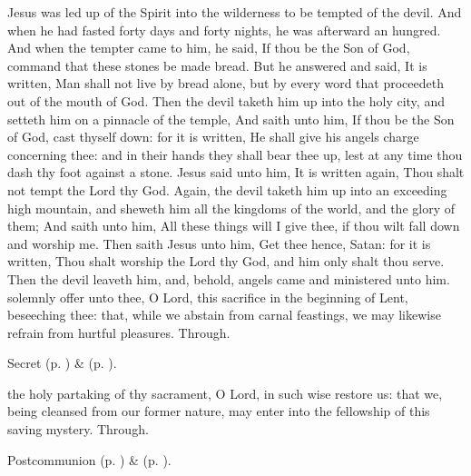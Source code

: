  Jesus was led up of the Spirit into the wilderness to be tempted of the devil. And when he had fasted forty days and forty nights, he was afterward an hungred. And when the tempter came to him, he said, If thou be the Son of God, command that these stones be made bread. But he answered and said, It is written, Man shall not live by bread alone, but by every word that proceedeth out of the mouth of God. Then the devil taketh him up into the holy city, and setteth him on a pinnacle of the temple, And saith unto him, If thou be the Son of God, cast thyself down: for it is written, He shall give his angels charge concerning thee: and in their hands they shall bear thee up, lest at any time thou dash thy foot against a stone. Jesus said unto him, It is written again, Thou shalt not tempt the Lord thy God. Again, the devil taketh him up into an exceeding high mountain, and sheweth him all the kingdoms of the world, and the glory of them; And saith unto him, All these things will I give thee, if thou wilt fall down and worship me. Then saith Jesus unto him, Get thee hence, Satan: for it is written, Thou shalt worship the Lord thy God, and him only shalt thou serve. Then the devil leaveth him, and, behold, angels came and ministered unto him.
\secret
{} solemnly offer unto thee, O Lord, this sacrifice in the beginning of Lent, beseeching thee: that, while we abstain from carnal feastings, we may likewise refrain from hurtful pleasures. Through.

\begin{rubric}
     Secret  (p. \pageref{AshWednesdayMassSecret}) \&   (p. \pageref{SPLivingDeparted}).
\end{rubric}

\postcommunion
{} the holy partaking of thy sacrament, O Lord, in such wise restore us: that we, being cleansed from our former nature, may enter into the fellowship of this saving mystery. Through.
\begin{rubric}
     Postcommunion  (p. \pageref{AshWednesdayMassPostcommunion}) \&   (p. \pageref{SPLivingDeparted}).
\end{rubric}


